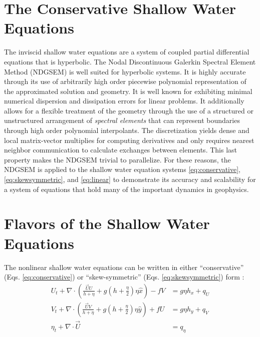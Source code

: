 \documentclass{softwaremanual}
\begin{document}
\section{The Conservative Shallow Water Equations}
The inviscid shallow water equations are a system of coupled partial differential equations that is hyperbolic. The Nodal Discontinuous Galerkin Spectral Element Method (NDGSEM) is well suited for hyperbolic systems. It is highly accurate through its use of arbitrarily high order piecewise polynomial representation of the approximated solution and geometry. It is well known for exhibiting minimal numerical dispersion and dissipation errors for linear problems. It additionally allows for a flexible treatment of the geometry through the use of a structured or unstructured arrangement of \textit{spectral elements} that can represent boundaries through high order polynomial interpolants. The discretization yields dense and local matrix-vector multiplies for computing derivatives and only requires nearest neighbor communication to calculate exchanges between elements. This last property makes the NDGSEM trivial to parallelize. For these reasons, the NDGSEM is applied to the shallow water equation systems \eqref{eq:conservative}, \eqref{eq:skewsymmetric}, and \eqref{eq:linear} to demonstrate its accuracy and scalability for a system of equations that hold many of the important dynamics in geophysics. 

\section{Flavors of the Shallow Water Equations}
The nonlinear shallow water equations can be written in either ``conservative'' (Eqs. \ref{eq:conservative}) or ``skew-symmetric'' (Eqs. \ref{eq:skewsymmetric}) form :
\begin{subequations}
\begin{align}
U_t  + \nabla \cdot \left( \frac{\vec{U}U}{h + \eta} + g \left(h + \frac{\eta}{2} \right)\eta\hat{x} \right) - fV &= g\eta h_x  + q_U\\
V_t  + \nabla \cdot \left( \frac{\vec{U}V}{h + \eta} + g \left(h + \frac{\eta}{2} \right)\eta\hat{y} \right) + fU &= g\eta h_y + q_V\\
\eta_t + \nabla \cdot \vec{U} &= q_\eta
\end{align}\label{eq:conservative}
\end{subequations}
\end{document}
